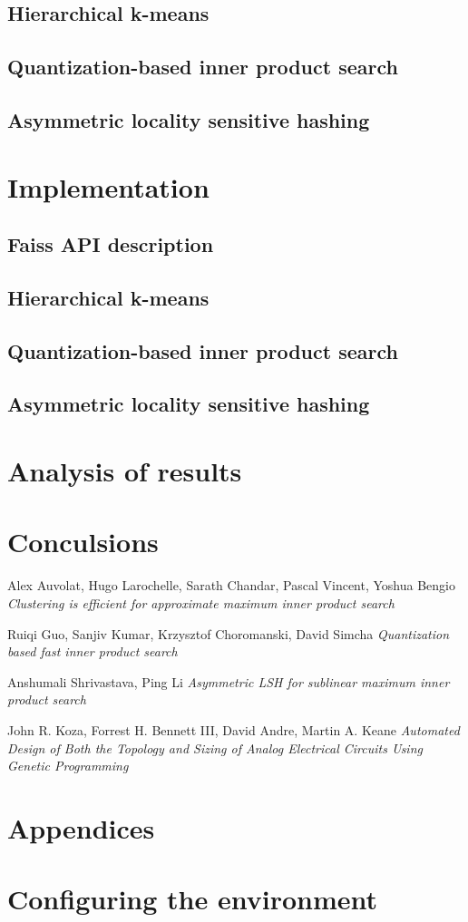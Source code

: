 \documentclass[12pt]{article}
\begin{document}
	\subsection{Hierarchical k-means}
	
	\subsection{Quantization-based inner product search}
	
	\subsection{Asymmetric locality sensitive hashing}
	
\section{Implementation}
	\subsection{Faiss API description}
	
	\subsection{Hierarchical k-means}
	
	\subsection{Quantization-based inner product search}
	
	\subsection{Asymmetric locality sensitive hashing}
	
\section{Analysis of results}
	
\section{Conculsions}
	
	\begin{thebibliography}{90}
		Alex Auvolat, Hugo Larochelle, Sarath Chandar, Pascal Vincent, Yoshua Bengio
		\textit{Clustering is efficient for approximate maximum inner product search}

		Ruiqi Guo, Sanjiv Kumar, Krzysztof Choromanski, David Simcha
		\textit{Quantization based fast inner product search}

		Anshumali Shrivastava, Ping Li
		\textit{Asymmetric LSH for sublinear maximum inner product search}

		John R. Koza, Forrest H. Bennett III, David Andre, Martin A. Keane
		\textit{Automated Design of Both the Topology and Sizing of Analog Electrical Circuits Using Genetic Programming}
	\end{thebibliography}
\section{Appendices}
\appendix
\section{Configuring the environment}
	
\end{document}
